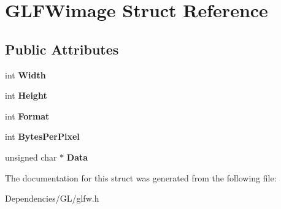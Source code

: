\hypertarget{struct_g_l_f_wimage}{\section{\-G\-L\-F\-Wimage \-Struct \-Reference}
\label{struct_g_l_f_wimage}
}
\subsection*{\-Public \-Attributes}
\begin{DoxyCompactItemize}
\item 
\hypertarget{struct_g_l_f_wimage_a2b3650d48aceaf984671230ecd89ad03}{int {\bfseries \-Width}}\label{struct_g_l_f_wimage_a2b3650d48aceaf984671230ecd89ad03}

\item 
\hypertarget{struct_g_l_f_wimage_ad34bc2c649ca7d73c50bb2fd2cda7be5}{int {\bfseries \-Height}}\label{struct_g_l_f_wimage_ad34bc2c649ca7d73c50bb2fd2cda7be5}

\item 
\hypertarget{struct_g_l_f_wimage_aa723b5892d211557c7005879977c2f0f}{int {\bfseries \-Format}}\label{struct_g_l_f_wimage_aa723b5892d211557c7005879977c2f0f}

\item 
\hypertarget{struct_g_l_f_wimage_a7da004b239a37d3d55424c0582f07cce}{int {\bfseries \-Bytes\-Per\-Pixel}}\label{struct_g_l_f_wimage_a7da004b239a37d3d55424c0582f07cce}

\item 
\hypertarget{struct_g_l_f_wimage_ae9dea9dc85de86c18df1cf172b9f3a3d}{unsigned char $\ast$ {\bfseries \-Data}}\label{struct_g_l_f_wimage_ae9dea9dc85de86c18df1cf172b9f3a3d}

\end{DoxyCompactItemize}


\-The documentation for this struct was generated from the following file\-:\begin{DoxyCompactItemize}
\item 
\-Dependencies/\-G\-L/glfw.\-h\end{DoxyCompactItemize}
